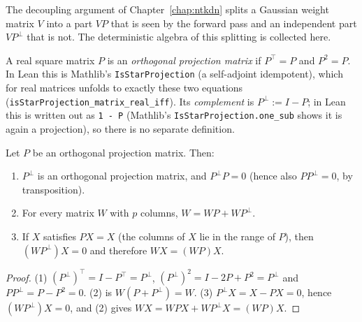 The decoupling argument of Chapter~\ref{chap:ntkdn} splits a Gaussian weight matrix $V$ into a part $VP$ that is seen by the forward pass and an independent part $VP^\perp$ that is not. The deterministic algebra of this splitting is collected here.

\begin{definition}\label{def:ntkcond:projector}
  \leanok
A real square matrix $P$ is an \emph{orthogonal projection matrix} if $P^\top=P$ and $P^2=P$. In Lean this is Mathlib's \texttt{IsStarProjection} (a self-adjoint idempotent), which for real matrices unfolds to exactly these two equations (\texttt{isStarProjection\_matrix\_real\_iff}). Its \emph{complement} is $P^\perp:=I-P$; in Lean this is written out as \texttt{1 - P} (Mathlib's \texttt{IsStarProjection.one\_sub} shows it is again a projection), so there is no separate definition.
\end{definition}

\begin{lemma}\label{lem:ntkcond:projectorAlgebra}
  \leanok
Let $P$ be an orthogonal projection matrix. Then:
\begin{enumerate}
  \item $P^\perp$ is an orthogonal projection matrix, and $P^\perp P=0$ (hence also $PP^\perp=0$, by transposition).
  \item For every matrix $W$ with $p$ columns, $W=WP+WP^\perp$.
  \item If $X$ satisfies $PX=X$ (the columns of $X$ lie in the range of $P$), then $(WP^\perp)X=0$ and therefore $WX=(WP)X$.
\end{enumerate}
\end{lemma}

\begin{proof}
  \leanok
(1) $(P^\perp)^\top=I-P^\top=P^\perp$, $(P^\perp)^2=I-2P+P^2=P^\perp$ and $PP^\perp=P-P^2=0$. (2) is $W(P+P^\perp)=W$. (3) $P^\perp X=X-PX=0$, hence $(WP^\perp)X=0$, and (2) gives $WX=WPX+WP^\perp X=(WP)X$.
\end{proof}

